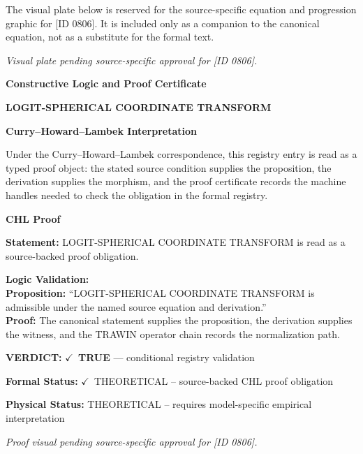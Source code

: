 \begingroup\footnotesize\sloppy
The visual plate below is reserved for the source-specific equation and progression graphic for [ID 0806]. It is included only as a companion to the canonical equation, not as a substitute for the formal text.
\par\endgroup
\begingroup\footnotesize\itshape
Visual plate pending source-specific approval for [ID 0806].
\par\endgroup

\clearpage
\begingroup\tzpsupportsetup
\noindent\textbf{\fontsize{10.8pt}{12.8pt}\selectfont [ID 0806] Constructive Logic and Proof Certificate}\par
\noindent\textbf{\fontsize{10pt}{12pt}\selectfont LOGIT-SPHERICAL COORDINATE TRANSFORM}\par
\vspace{0.45em}
\begingroup
\footnotesize
\setlength{\parskip}{0.22em}
\setlength{\parindent}{0pt}
\noindent\textbf{Curry--Howard--Lambek Interpretation}\par
Under the Curry--Howard--Lambek correspondence, this registry entry is read as a typed proof
object: the stated source condition supplies the proposition, the derivation supplies the
morphism, and the proof certificate records the machine handles needed to check the obligation
in the formal registry.

\vspace{0.45em}
\noindent\textbf{CHL Proof}\par
\textbf{Statement:} LOGIT-SPHERICAL COORDINATE TRANSFORM is read as a source-backed proof obligation.

\textbf{Logic Validation:}\\
\textbf{Proposition:} ``LOGIT-SPHERICAL COORDINATE TRANSFORM is admissible under the named source equation and derivation.''\\
\textbf{Proof:} The canonical statement supplies the proposition, the derivation supplies the witness, and the TRAWIN operator chain records the normalization path.

\textbf{VERDICT:} \ensuremath{\checkmark}\ \textbf{TRUE} --- conditional registry validation

\textbf{Formal Status:} \ensuremath{\checkmark}\ THEORETICAL -- source-backed CHL proof obligation

\textbf{Physical Status:} THEORETICAL -- requires model-specific empirical interpretation
\par\vspace{0.45em}
\par
\vfill
\begingroup\footnotesize\itshape
Proof visual pending source-specific approval for [ID 0806].
\par\endgroup
\vfill
\endgroup
\endgroup
